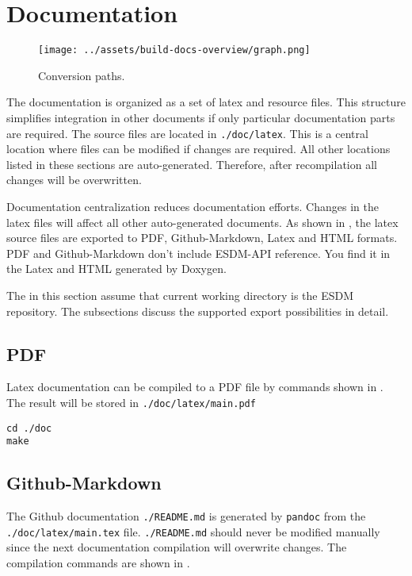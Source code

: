 \section{Documentation}

\begin{figure}[!ht]
  \begin{center}
    \texttt{[image: ../assets/build-docs-overview/graph.png]}
  \end{center}
  \caption{Conversion paths.}
  \label{fig:build-docs-overview}
\end{figure}

The documentation is organized as a set of latex and resource files.
This structure simplifies integration in other documents if only particular documentation parts are required.
The source files are located in \lstinline|./doc/latex|.
This is a central location where files can be modified if changes are required.
All other locations listed in these sections are auto-generated.
Therefore, after recompilation all changes will be overwritten.

Documentation centralization reduces documentation efforts.
Changes in the latex files will affect all other auto-generated documents.
As shown in , the latex source files are exported to PDF, Github-Markdown, Latex and HTML formats.
PDF and Github-Markdown don't include ESDM-API reference.
You find it in the Latex and HTML generated by Doxygen.

The  in this section assume that current working directory is the ESDM repository.
The subsections discuss the supported export possibilities in detail.

\subsection{PDF}
Latex documentation can be compiled to a PDF file by commands shown in .
The result will be stored in \lstinline|./doc/latex/main.pdf|

\begin{lstlisting}[caption={Make PDF document},label={code:doc:latex}]
cd ./doc
make
\end{lstlisting}

\subsection{Github-Markdown}
The Github documentation \lstinline|./README.md| is generated by \lstinline|pandoc| from the \lstinline|./doc/latex/main.tex| file.
\lstinline|./README.md| should never be modified manually since the next documentation compilation will overwrite changes.
The compilation commands are shown in .

